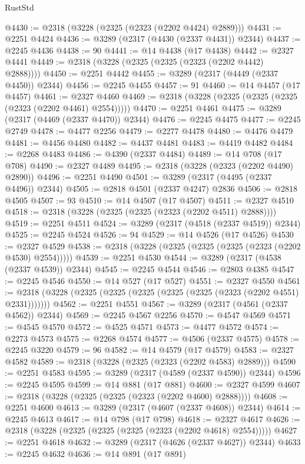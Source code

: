 \begin{lexlean}{RustStd}
\begin{coremodule}
@4430 := @2318 (@3228 (@2325 (@2323 (@2202 @4424) @2889)))
@4431 := @2251 @4424
@4436 := @3289 (@2317 (@4430 (@2337 @4431)) @2344)
@4437 := @2245 @4436
@4438 := 90
@4441 := @14 @4438 (@17 @4438)
@4442 := @2327 @4441
@4449 := @2318 (@3228 (@2325 (@2325 (@2323 (@2202 @4442) @2888))))
@4450 := @2251 @4442
@4455 := @3289 (@2317 (@4449 (@2337 @4450)) @2344)
@4456 := @2245 @4455
@4457 := 91
@4460 := @14 @4457 (@17 @4457)
@4461 := @2327 @4460
@4469 := @2318 (@3228 (@2325 (@2325 (@2325 (@2323 (@2202 @4461) @2554)))))
@4470 := @2251 @4461
@4475 := @3289 (@2317 (@4469 (@2337 @4470)) @2344)
@4476 := @2245 @4475
@4477 := @2245 @2749
@4478 := @4477 @2256
@4479 := @2277 @4478
@4480 := @4476 @4479
@4481 := @4456 @4480
@4482 := @4437 @4481
@4483 := @4419 @4482
@4484 := @2268 @4483
@4486 := @4390 (@2337 @4484)
@4489 := @14 @708 (@17 @708)
@4490 := @2327 @4489
@4495 := @2318 (@3228 (@2323 (@2202 @4490) @2890))
@4496 := @2251 @4490
@4501 := @3289 (@2317 (@4495 (@2337 @4496)) @2344)
@4505 := @2818 @4501 (@2337 @4247) @2836
@4506 := @2818 @4505
@4507 := 93
@4510 := @14 @4507 (@17 @4507)
@4511 := @2327 @4510
@4518 := @2318 (@3228 (@2325 (@2325 (@2323 (@2202 @4511) @2888))))
@4519 := @2251 @4511
@4524 := @3289 (@2317 (@4518 (@2337 @4519)) @2344)
@4525 := @2245 @4524
@4526 := 94
@4529 := @14 @4526 (@17 @4526)
@4530 := @2327 @4529
@4538 := @2318 (@3228 (@2325 (@2325 (@2325 (@2323 (@2202 @4530) @2554)))))
@4539 := @2251 @4530
@4544 := @3289 (@2317 (@4538 (@2337 @4539)) @2344)
@4545 := @2245 @4544
@4546 := @2803 @4385
@4547 := @2245 @4546
@4550 := @14 @527 (@17 @527)
@4551 := @2327 @4550
@4561 := @2318 (@3228 (@2325 (@2325 (@2325 (@2325 (@2325 (@2323 (@2202 @4551) @2331)))))))
@4562 := @2251 @4551
@4567 := @3289 (@2317 (@4561 (@2337 @4562)) @2344)
@4569 := @2245 @4567 @2256
@4570 := @4547 @4569
@4571 := @4545 @4570
@4572 := @4525 @4571
@4573 := @4477 @4572
@4574 := @2273 @4573
@4575 := @2268 @4574
@4577 := @4506 (@2337 @4575)
@4578 := @2245 @3220
@4579 := 96
@4582 := @14 @4579 (@17 @4579)
@4583 := @2327 @4582
@4589 := @2318 (@3228 (@2325 (@2323 (@2202 @4583) @2889)))
@4590 := @2251 @4583
@4595 := @3289 (@2317 (@4589 (@2337 @4590)) @2344)
@4596 := @2245 @4595
@4599 := @14 @881 (@17 @881)
@4600 := @2327 @4599
@4607 := @2318 (@3228 (@2325 (@2325 (@2323 (@2202 @4600) @2888))))
@4608 := @2251 @4600
@4613 := @3289 (@2317 (@4607 (@2337 @4608)) @2344)
@4614 := @2245 @4613
@4617 := @14 @798 (@17 @798)
@4618 := @2327 @4617
@4626 := @2318 (@3228 (@2325 (@2325 (@2325 (@2323 (@2202 @4618) @2554)))))
@4627 := @2251 @4618
@4632 := @3289 (@2317 (@4626 (@2337 @4627)) @2344)
@4633 := @2245 @4632
@4636 := @14 @891 (@17 @891)

\end{coremodule}
\end{lexlean}
